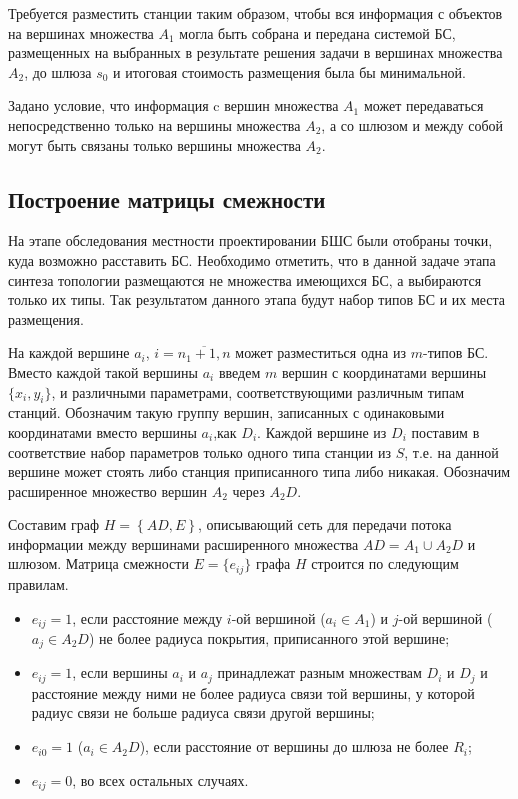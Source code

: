 Требуется разместить станции таким образом, чтобы вся информация с объектов на вершинах множества $A_1$ могла быть собрана и передана системой БС, размещенных на выбранных в результате решения задачи в вершинах множества  $A_2$, до шлюза $s_0$ и итоговая стоимость размещения была бы минимальной.


Задано условие, что информация c вершин множества $A_1$ может передаваться непосредственно только на вершины множества $A_2$, а со шлюзом и между собой могут быть связаны только вершины множества $A_2$.

\subsection{Построение матрицы смежности}

На этапе обследования местности проектировании БШС были отобраны точки, куда возможно расставить БС. Необходимо отметить, что в данной задаче этапа синтеза топологии размещаются не множества имеющихся БС, а выбираются только их типы. Так результатом данного этапа будут набор типов БС и их места размещения.

На каждой вершине $a_i$, $i= \overline{n_1+1,n}$ может разместиться одна из $m$-типов БС. Вместо каждой такой вершины $a_i$ введем $m$ вершин с координатами вершины $\{x_i, y_i \}$, и различными параметрами, соответствующими различным типам станций. Обозначим такую группу вершин, записанных с одинаковыми координатами вместо вершины $a_i$,как $D_i$. Каждой вершине из $D_i$ поставим в соответствие набор параметров только одного типа станции из $S$, т.е. на данной вершине может стоять либо станция приписанного типа либо никакая. Обозначим расширенное множество вершин $A_2$ через $A_2D$.

Составим граф $H=\left\{AD,E\right\}$, описывающий сеть для передачи потока информации между вершинами расширенного множества $AD=A_1 \cup A_2D$ и шлюзом.
Матрица смежности $E = \{e_{ij} \}$ графа $H$ строится по следующим правилам.

\begin{itemize}
    \item $e_{ij} = 1$, если расстояние между $i$-ой вершиной ($a_i \in A_1$) и $j$-ой вершиной ($a_j \in A_2D$) не более радиуса покрытия, приписанного этой вершине;
    \item $e_{ij} = 1$, если вершины $a_i$ и $a_j$   принадлежат разным множествам $D_i$ и $D_j$ и расстояние между ними не более радиуса связи той вершины, у которой радиус связи не больше радиуса связи другой вершины;
    \item $e_{i0} = 1$ ($a_i \in A_2D$), если расстояние от вершины до шлюза не более $R_i$;
    \item $e_{ij} = 0$, во всех остальных случаях.
\end{itemize}

